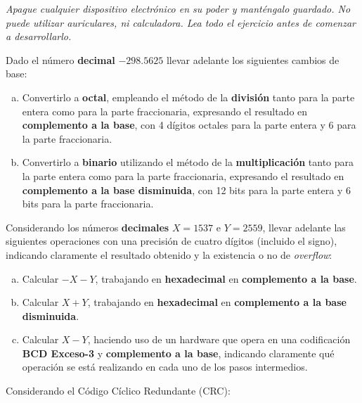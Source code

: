 \documentclass[12pt,a4paper]{article}
\begin{document}

\begin{center}
	\emph{Apague cualquier dispositivo electrónico en su poder y manténgalo guardado. No puede utilizar auriculares, ni calculadora. Lea todo el ejercicio antes de comenzar a desarrollarlo.}
\end{center}

Dado el número \textbf{decimal} $-298.5625$ llevar adelante los siguientes cambios de base:
\begin{enumerate}[a)]
	\item Convertirlo a \textbf{octal}, empleando el método de la \textbf{división} tanto para la parte entera como para la parte fraccionaria, expresando el resultado en \textbf{complemento a la base}, con 4 dígitos octales para la parte entera y 6 para la parte fraccionaria.

	\item Convertirlo a \textbf{binario} utilizando el método de la \textbf{multiplicación} tanto para la parte entera como para la parte fraccionaria, expresando el resultado en \textbf{complemento a la base disminuida}, con 12 bits para la parte entera y 6 bits para la parte fraccionaria.
\end{enumerate}

Considerando los números {\textbf{decimales}} $X = 1537$ e $Y = 2559$, llevar adelante las siguientes operaciones con una precisión de cuatro dígitos (incluido el signo), indicando claramente el resultado obtenido y la existencia o no de \emph{overflow}:
\begin{enumerate}[a)]
	\item Calcular $- X - Y$, trabajando en \textbf{hexadecimal} en \textbf{complemento a la base}.
	\item Calcular $ X + Y $, trabajando en \textbf{hexadecimal} en \textbf{complemento a la base disminuida}.
	\item Calcular $X - Y$, haciendo uso de un hardware que opera en una codificación \textbf{BCD Exceso-3} y \textbf{complemento a la base}, indicando claramente qué operación se está realizando en cada uno de los pasos intermedios.
\end{enumerate}

 Considerando el Código Cíclico Redundante (CRC):
\end{document}
